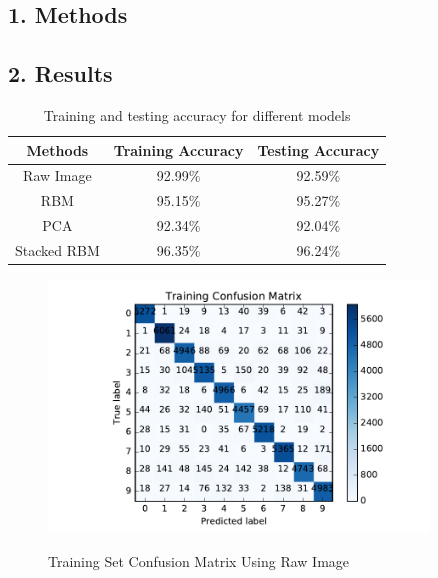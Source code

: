 \subsection*{\large 1. Methods}

\subsection*{\large 2. Results}


\begin{table}[H]
	\centering
	\caption{Training and testing accuracy for different models}
	\label{table:BESTacc}	
	\begin{tabular}{c | c | c}
		\hline \hline
		Methods  	&	Training Accuracy 	&	Testing Accuracy \\[0.1cm]
		\hline
		Raw Image	&	92.99\%				& 	92.59\%			 \\[0.1cm]
		RBM			&	95.15\%				& 	95.27\%			 \\[0.1cm]
		PCA			& 	92.34\%				& 	92.04\%			 \\[0.1cm]
		Stacked RBM & 	96.35\%				& 	96.24\%			 \\[0.1cm]
		\hline	
	\end{tabular}
\end{table}

\begin{figure}[H]
\centering
\includegraphics[width=0.9\textwidth]{./figures/train_raw.pdf}\
\caption{\label{fig:train_raw} Training Set Confusion Matrix Using Raw Image}
\end{figure}

